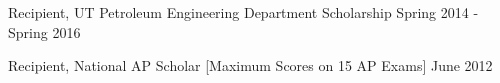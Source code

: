 \documentclass[letterpaper,11pt]{article}
\newcommand{\resumeSubHeadingListStart}{\begin{itemize}[leftmargin=*]}
\newcommand{\resumeSubHeadingListEnd}{\end{itemize}}
\begin{document}
    \vspace{-5pt}\item{Recipient, UT Petroleum Engineering Department Scholarship \hfill Spring 2014 - Spring 2016}\\
    \vspace{-5pt}\item{Recipient, National AP Scholar [Maximum Scores on 15 AP Exams] \hfill June 2012}\\

%



\end{document}
